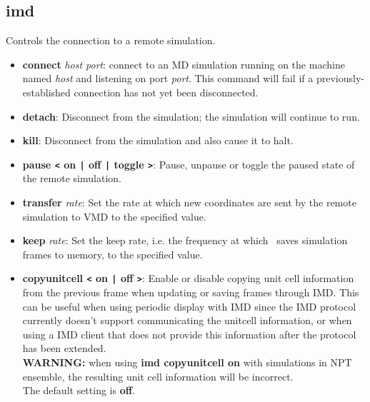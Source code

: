\subsection{imd}
\label{ug:ui:text:imd}
Controls the connection to a remote simulation.  

\begin{itemize}
  \item {\bf connect} {\it host port}: connect to an MD simulation running on
    the machine named {\it host} and listening on port {\it port}.   This 
    command will fail if a previously-established connection has not yet
    been disconnected.

  \item {\bf detach}: Disconnect from the simulation; the simulation will 
    continue to run.
 
  \item {\bf kill}: Disconnect from the simulation and also cause it to halt.

  \item {\bf pause {\tt <}  on {\tt |} off {\tt |} toggle {\tt >}}: Pause, unpause or toggle the paused state of the remote simulation.

  \item {\bf transfer} {\it rate}: Set the rate at which new coordinates are
    sent by the remote simulation to VMD to the specified value.

  \item {\bf keep} {\it rate}: Set the keep rate, i.e. the frequency at which
    \VMD\ saves simulation frames to memory, to the specified value.

  \item {\bf copyunitcell {\tt <}  on {\tt |} off {\tt >}}: 
    Enable or disable copying unit cell information from the previous 
    frame when updating or saving frames through IMD. 
    This can be useful when using periodic display with IMD since
    the IMD protocol currently doesn't support communicating the 
    unitcell information, or when using a IMD client that does not
    provide this information after the protocol has been extended.\\
    {\bf WARNING:} when using {\bf imd copyunitcell on} with simulations 
    in NPT ensemble, the resulting unit cell information will be incorrect.\\
    The default setting is {\bf off}.
\end{itemize}
 
